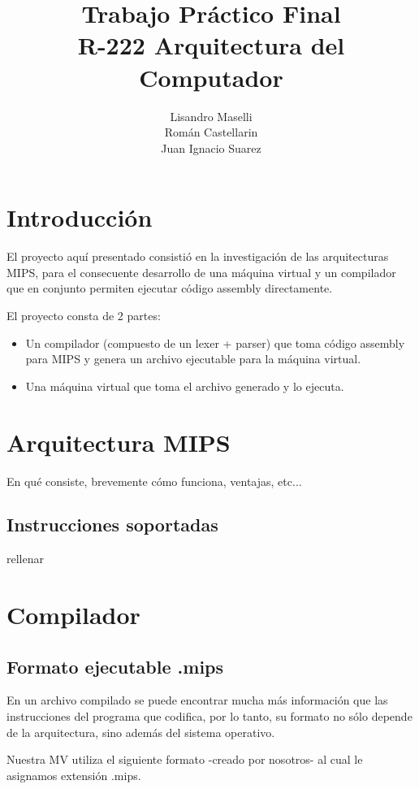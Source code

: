 \documentclass[12pt]{article}
\begin{document}
\title{
Trabajo Práctico Final \\
\large R-222 Arquitectura del Computador}
\author{ Lisandro Maselli\\
Román Castellarin\\
Juan Ignacio Suarez}
\maketitle
\section{Introducción}
El proyecto aquí presentado consistió en la investigación de las arquitecturas MIPS, para el consecuente desarrollo de una máquina virtual y un compilador que en conjunto permiten ejecutar código assembly directamente.

El proyecto consta de 2 partes:
\begin{itemize}
\item Un compilador (compuesto de un lexer + parser) que toma código assembly para MIPS y genera un archivo ejecutable para la máquina virtual.
\item Una máquina virtual que toma el archivo generado y lo ejecuta.
\end{itemize}    

\section{Arquitectura MIPS}
En qué consiste, brevemente cómo funciona, ventajas, etc...
\subsection{Instrucciones soportadas}
rellenar
    
\section{Compilador}
\subsection{Formato ejecutable .mips}

En un archivo compilado se puede encontrar mucha más información que las instrucciones del programa que codifica, por lo tanto, su formato no sólo depende de la arquitectura, sino además del sistema operativo.

Nuestra MV utiliza el siguiente formato -creado por nosotros- al cual le asignamos extensión .mips.
\end{document}
